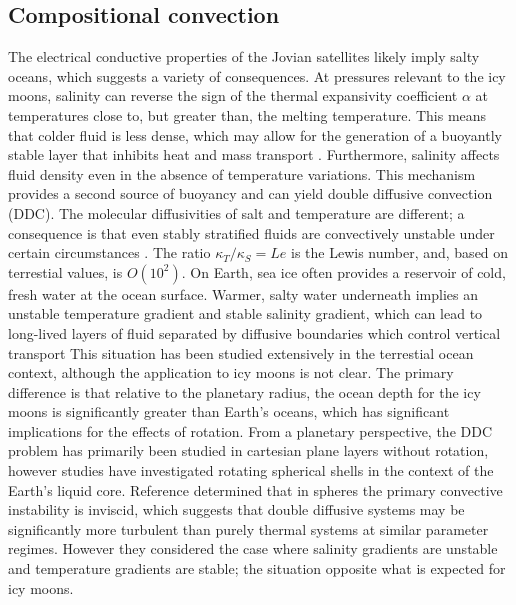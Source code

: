 \documentclass{article}
\begin{document}
\subsection{Compositional convection}

The electrical conductive properties of the Jovian satellites likely imply salty oceans\citep{cZ00}, which suggests a variety of consequences. At pressures relevant to the icy moons, salinity can reverse the sign of the thermal expansivity coefficient $\alpha$ at temperatures close to, but greater than, the melting temperature. This means that colder fluid is less dense, which may allow for the generation of a buoyantly stable layer that inhibits heat and mass transport \citep{aT64}. 
Furthermore, salinity affects fluid density even in the absence of temperature variations. 
This mechanism provides a second source of buoyancy and can yield double diffusive convection (DDC). The molecular diffusivities of salt and temperature are different; a consequence is that even stably stratified fluids are convectively unstable under certain circumstances \citep{tR13}. 
The ratio $\kappa_T/ \kappa_S=Le$ is the Lewis number, and, based on terrestial values, is $O(10^2)$.
On Earth, sea ice often provides a reservoir of cold, fresh water at the ocean surface. 
Warmer, salty water underneath implies an unstable temperature gradient and stable salinity gradient, which can lead to long-lived layers of fluid separated by diffusive boundaries which control vertical transport \citep{mT08}
This situation has been studied extensively in the terrestial ocean context\citep{jT73,jT02}, although the application to icy moons is not clear. The primary difference is that relative to the planetary radius, the ocean depth for the icy moons is significantly greater than Earth's oceans, which has significant implications for the effects of rotation.
From a planetary perspective, the DDC problem has primarily been studied in cartesian plane layers without rotation\citep{gM12}, however studies have investigated rotating spherical shells \citep{rM19,jM21} in the context of the Earth's liquid core. Reference \citep{rM19} determined that in spheres the primary convective instability is inviscid, which suggests that double diffusive systems may be significantly more turbulent than purely thermal systems at similar parameter regimes. However they considered the case where salinity gradients are unstable and temperature gradients are stable; the situation opposite what is expected for icy moons.
\end{document}
